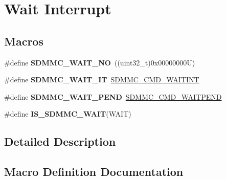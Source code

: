 \hypertarget{group___s_d_m_m_c___l_l___wait___interrupt___state}{}\section{Wait Interrupt}
\label{group___s_d_m_m_c___l_l___wait___interrupt___state}
\subsection*{Macros}
\begin{DoxyCompactItemize}
\item 
\mbox{\label{group___s_d_m_m_c___l_l___wait___interrupt___state_gaed576222893de29d2f77a39600e86daf}} 
\#define {\bfseries S\+D\+M\+M\+C\+\_\+\+W\+A\+I\+T\+\_\+\+NO}~((uint32\+\_\+t)0x00000000\+U)
\item 
\mbox{\label{group___s_d_m_m_c___l_l___wait___interrupt___state_gaf48c98d1a6df7b4b84e4cccd7c374938}} 
\#define {\bfseries S\+D\+M\+M\+C\+\_\+\+W\+A\+I\+T\+\_\+\+IT}~\mbox{\hyperlink{group___peripheral___registers___bits___definition_gaf1e27932e37eb3de74eea7f9f07e689a}{S\+D\+M\+M\+C\+\_\+\+C\+M\+D\+\_\+\+W\+A\+I\+T\+I\+NT}}
\item 
\mbox{\label{group___s_d_m_m_c___l_l___wait___interrupt___state_gaea81a66e19abd478aee6ae6715383eca}} 
\#define {\bfseries S\+D\+M\+M\+C\+\_\+\+W\+A\+I\+T\+\_\+\+P\+E\+ND}~\mbox{\hyperlink{group___peripheral___registers___bits___definition_gaae91836cca981d6b0fde3621876ce078}{S\+D\+M\+M\+C\+\_\+\+C\+M\+D\+\_\+\+W\+A\+I\+T\+P\+E\+ND}}
\item 
\#define {\bfseries I\+S\+\_\+\+S\+D\+M\+M\+C\+\_\+\+W\+A\+IT}(W\+A\+IT)
\end{DoxyCompactItemize}


\subsection{Detailed Description}


\subsection{Macro Definition Documentation}
\mbox{\label{group___s_d_m_m_c___l_l___wait___interrupt___state_gaddf9d4ffd6581a6c57e8e62f7b5ac8a2}} 
